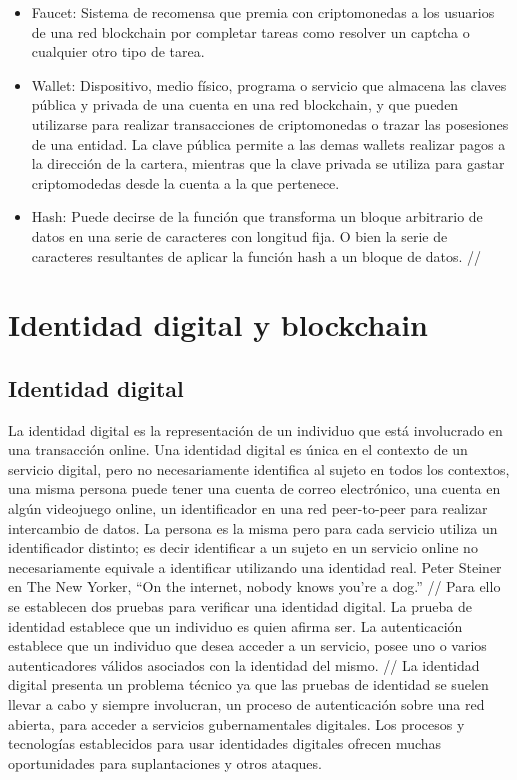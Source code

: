 \documentclass[12pt]{report}
\begin{document}
\begin{itemize}
//
\item
Faucet: Sistema de recomensa que premia con criptomonedas a los usuarios de una red blockchain por completar tareas como resolver un captcha o cualquier otro tipo de tarea.

\item
Wallet: Dispositivo, medio físico, programa o servicio que almacena las claves pública y privada de una cuenta en una red blockchain, y que pueden utilizarse para realizar transacciones de criptomonedas o trazar las posesiones de una entidad. La clave pública permite a las demas wallets realizar pagos a la dirección de la cartera, mientras que la clave privada se utiliza para gastar criptomodedas desde la cuenta a la que pertenece.

\item
Hash: Puede decirse de la función que transforma un bloque arbitrario de datos en una serie de caracteres con longitud fija. O bien la serie de caracteres resultantes de aplicar la función hash a un bloque de datos.
//
\end{itemize}
\chapter{Identidad digital y blockchain}
\section{Identidad digital}

La identidad digital es la representación de un individuo que está involucrado en una transacción online. Una identidad digital es única en el contexto de un servicio digital, pero no necesariamente identifica al sujeto en todos los contextos, una misma persona puede tener una cuenta de correo electrónico, una cuenta en algún videojuego online, un identificador en una red peer-to-peer para realizar intercambio de datos. La persona es la misma pero para cada servicio utiliza un identificador distinto; es decir identificar a un sujeto en un servicio online no necesariamente equivale a identificar utilizando una identidad real. Peter Steiner en The New Yorker, “On the internet, nobody knows you’re a dog.” \cite{steiner1993internet} 
//
Para ello se establecen dos pruebas para verificar una identidad digital.
La prueba de identidad establece que un individuo es quien afirma ser.
La autenticación establece que un individuo que desea acceder a un servicio, posee uno o varios autenticadores válidos asociados con la identidad del mismo.
//
La identidad digital presenta un problema técnico ya que las pruebas de identidad se suelen llevar a cabo y siempre involucran, un proceso de autenticación sobre una red abierta, para acceder a servicios gubernamentales digitales. Los procesos y tecnologías establecidos para usar identidades digitales ofrecen muchas oportunidades para suplantaciones y otros ataques.
\end{document}
